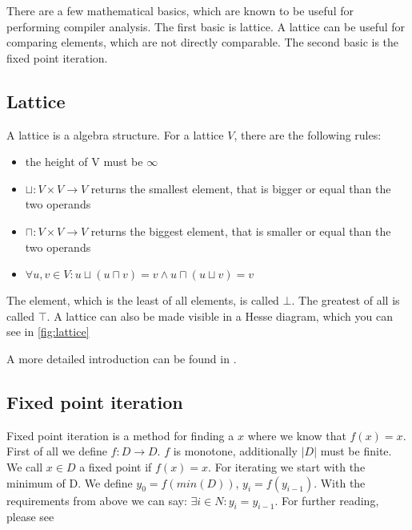 There are a few mathematical basics, which are known to be useful for performing compiler analysis. The first basic is lattice. A lattice can be useful for comparing elements, which are not directly comparable. The second basic is the fixed point iteration.

\subsection{Lattice}

A lattice is a algebra structure. For a lattice $V$, there are the following rules:

\begin{itemize}
	\item the height of V must be $\infty$
	\item $\sqcup: V \times V \rightarrow V$ returns the smallest element, that is bigger or equal than the two operands
	\item $\sqcap: V \times V \rightarrow V$ returns the biggest element, that is smaller or equal than the two operands
	\item $\forall u,v \in V : u \sqcup ( u \sqcap v) = v \wedge u \sqcap ( u \sqcup v ) = v$
\end{itemize}

The element, which is the least of all elements, is called $\bot$. The greatest of all is called $\top$. A lattice can also be made visible in a Hesse diagram, which you can see in \autoref{fig:lattice}

A more detailed introduction can be found in \cite{lattice_theory}.

\subsection{Fixed point iteration}
Fixed point iteration is a method for finding a $x$ where we know that $f(x)=x$. \newline
First of all we define $f: D \rightarrow D$. $f$ is monotone, additionally $|D|$ must be finite. We call $x \in D$ a fixed point if $f(x)=x$.
For iterating we start with the minimum of D. We define $y_0=f(min(D))$, $y_i=f(y_{i-1})$. With the requirements from above we can say: $\exists i \in N : y_i = y_{i-1}$. For further reading, please see \cite{fixed-point-iteration-basic}


